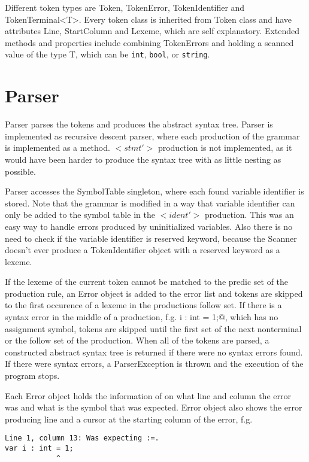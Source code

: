 \documentclass[a4paper,12pt]{article}
\newcommand{\ttt}[1]{\texttt{#1}}
\begin{document}
Different token types are Token, TokenError, TokenIdentifier and
TokenTerminal<T>. Every token class is inherited from Token class and
have attributes Line, StartColumn and Lexeme, which are self explanatory.
Extended methods and properties include combining TokenErrors and holding a
scanned value of the type T, which can be \ttt{int}, \ttt{bool}, or
\ttt{string}.

\section{Parser}
Parser parses the tokens and produces the abstract syntax tree. Parser is
implemented as recursive descent parser, where each production of the grammar is
implemented as a method. $<stmt'>$ production is not implemented, as it would
have been harder to produce the syntax tree with as little nesting as possible.

Parser accesses the SymbolTable singleton, where each found variable identifier
is stored. Note that the grammar is modified in a way that variable identifier
can only be added to the symbol table in the $<ident'>$ production. This was an
easy way to handle errors produced by uninitialized variables. Also there is no
need to check if the variable identifier is reserved keyword, because the
Scanner doesn't ever produce a TokenIdentifier object with a reserved keyword as
a lexeme.

If the lexeme of the current token cannot be matched to the predic set of the
production rule, an Error object is added to the error list and tokens are
skipped to the first occurence of a lexeme in the productions follow set. If
there is a syntax error in the middle of a production, f.g. 
\verb@var i : int = 1;@, which has no assignment symbol, tokens are skipped
until the first set of the next nonterminal or the follow set of the production.
When all of the tokens are parsed, a constructed abstract syntax tree is
returned if there were no syntax errors found. If there were syntax errors, a
ParserException is thrown and the execution of the program stops.

Each Error object holds the information of on what line and column the error was
and what is the symbol that was expected. Error object also shows the error
producing line and a cursor at the starting column of the error, f.g. 
\begin{verbatim}
Line 1, column 13: Was expecting :=. 
var i : int = 1;
            ^
\end{verbatim}
\end{document}
